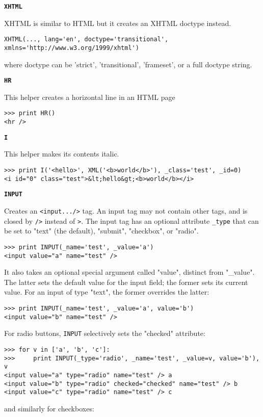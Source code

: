 \documentclass[justified,sixbynine,notoc]{tufte-book}
\def\ft{\small\tt}
\def\inxx#1{\index{#1}}
\begin{document}
\begin{fullwidth}
{\bf {\ft XHTML}}

\inxx{XHTML}

XHTML is similar to HTML but it creates an XHTML doctype instead.
\begin{lstlisting}
XHTML(..., lang='en', doctype='transitional', xmlns='http://www.w3.org/1999/xhtml')
\end{lstlisting}
\noindent where doctype can be 'strict', 'transitional', 'frameset', or a full doctype string.

{\bf {\ft HR}}

\inxx{HR}

This helper creates a horizontal line in an HTML page
\begin{lstlisting}
>>> print HR()
<hr />
\end{lstlisting}

{\bf {\ft I}}

\inxx{I}

This helper makes its contents italic.
\begin{lstlisting}
>>> print I('<hello>', XML('<b>world</b>'), _class='test', _id=0)
<i id="0" class="test">&lt;hello&gt;<b>world</b></i>
\end{lstlisting}

{\bf {\ft INPUT}}

\inxx{INPUT}

Creates an {\ft <input.../>} tag. An input tag may not contain other tags, and is closed by {\ft />} instead of {\ft >}. The input tag has an optional attribute {\ft \_type} that can be set to "text" (the default), "submit", "checkbox", or "radio".
\begin{lstlisting}
>>> print INPUT(_name='test', _value='a')
<input value="a" name="test" />
\end{lstlisting}

It also takes an optional special argument called "value", distinct from "\_value". The latter sets the default value for the input field; the former sets its current value. For an input of type "text", the former overrides the latter:
\begin{lstlisting}
>>> print INPUT(_name='test', _value='a', value='b')
<input value="b" name="test" />
\end{lstlisting}

For radio buttons, {\ft INPUT} selectively sets the "checked" attribute:

\inxx{radio}
\begin{lstlisting}
>>> for v in ['a', 'b', 'c']:
>>>     print INPUT(_type='radio', _name='test', _value=v, value='b'), v
<input value="a" type="radio" name="test" /> a
<input value="b" type="radio" checked="checked" name="test" /> b
<input value="c" type="radio" name="test" /> c
\end{lstlisting}
\noindent and similarly for checkboxes:


\end{fullwidth}
\end{document}
